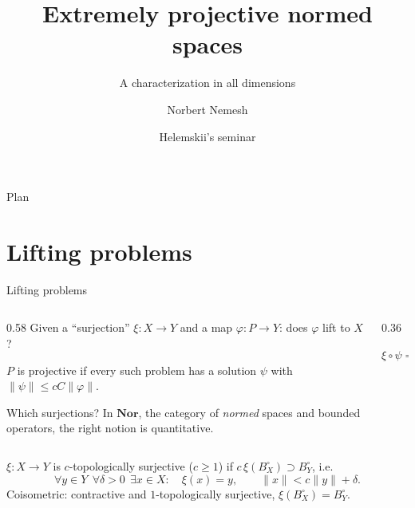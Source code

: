 \documentclass[10pt,aspectratio=169]{beamer}
\title[Extremely projective normed spaces]{Extremely projective normed spaces}
\subtitle{A characterization in all dimensions}
\author[N.\,T.\,Nemesh]{Norbert Nemesh}
\institute{Faculty of Mechanics and Mathematics\\
  Lomonosov Moscow State University}
\date{Helemskii's seminar}
\newcommand{\Nor}{\mathbf{Nor}}
\begin{document}
\begin{frame}
  \titlepage
\end{frame}

\begin{frame}[noframenumbering]{Plan}
  \tableofcontents[hideallsubsections]
\end{frame}

\section{Lifting problems}

\begin{frame}{Lifting problems}
  \begin{columns}[c,onlytextwidth]
    \begin{column}{0.58\textwidth}
      Given a ``surjection'' $\xi\colon X\to Y$ and a map $\varphi\colon P\to Y$:
      does $\varphi$ lift to $X$?
      \medskip

      $P$ is \alert{projective} if every such problem has a solution $\psi$
      with $\|\psi\|\le cC\|\varphi\|$.
      \medskip

      Which surjections? In $\Nor$, the category of \emph{normed} spaces and
      bounded operators, the right notion is quantitative.
    \end{column}
    \begin{column}{0.36\textwidth}
      \centering

      {\small $\xi\circ\psi=\varphi$}
    \end{column}
  \end{columns}
  \medskip
  \begin{definition}
    $\xi\colon X\to Y$ is \alert{$c$-topologically surjective} ($c\ge1$) if
    $c\,\xi(B_X^\circ)\supset B_Y^\circ$, i.e.
    \[
      \forall y\in Y\ \ \forall\delta>0\ \ \exists x\in X:\quad
      \xi(x)=y,\qquad \|x\|<c\|y\|+\delta .
    \]
    \alert{Coisometric}: contractive and $1$-topologically surjective,
    $\xi(B_X^\circ)=B_Y^\circ$.
  \end{definition}
\end{frame}
\end{document}
